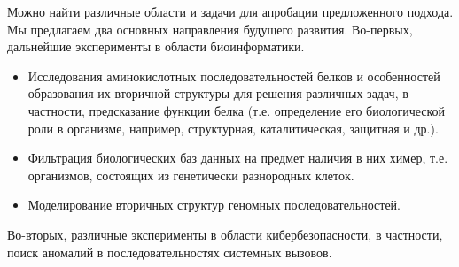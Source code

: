Можно найти различные области и задачи для апробации предложенного подхода. Мы предлагаем два основных направления будущего развития. Во-первых, дальнейшие эксперименты в области биоинформатики.
\begin{itemize}
    \item Исследования аминокислотных последовательностей белков и особенностей образования их вторичной структуры для решения различных задач, в частности, предсказание функции белка (т.е. определение его биологической роли в организме, например, структурная, каталитическая, защитная и др.).
    \item Фильтрация биологических баз данных на предмет наличия в них химер, т.е. организмов, состоящих из генетически разнородных клеток.
    \item Моделирование вторичных структур геномных последовательностей.
\end{itemize}
 Во-вторых, различные эксперименты в области кибербезопасности, в частности, поиск аномалий в последовательностях системных вызовов.


%

\renewcommand\refname{Список литературы}

